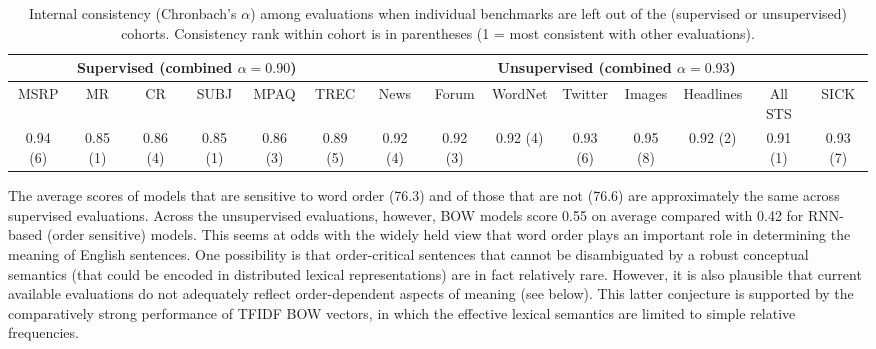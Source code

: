 \documentclass[11pt,letterpaper]{article}
\begin{document}
\hspace*{-2cm}
\begin{table*}[ht]
\begin{adjustwidth}{-1cm}{}
\renewcommand{\tabcolsep}{4.6pt}
\footnotesize
\begin{center}
      {
        \begin{tabular}{cccccc|cccccccc}
          \multicolumn{6}{c|}{Supervised (combined \(\alpha = 0.90\))} & \multicolumn{8}{c}{Unsupervised (combined \(\alpha = 0.93\))} \\
          \hline
                     MSRP & MR & CR & SUBJ & MPAQ & TREC & News & Forum & WordNet & Twitter & Images & Headlines & All STS  & SICK \\
                                          \footnotesize  0.94 (6) &	0.85 (1)	 &0.86 (4)	 &0.85 (1) &	0.86	(3) &0.89 (5) &	0.92	(4) &0.92 (3)	 &0.92 (4) &	0.93 (6)  &	0.95 (8)	 &0.92 (2)  &	0.91 (1)  &0.93 (7) \\
                                          \hline
        \end{tabular}
    }
    \caption{\label{consistency} Internal consistency (Chronbach's \(\alpha\)) among evaluations when individual benchmarks are left out of the (supervised or unsupervised) cohorts. Consistency rank within cohort is in parentheses (1 = most consistent with other evaluations).}
  \end{center}
  \vspace*{-4ex}
  \end{adjustwidth}
\end{table*}

  



\vspace{5pt} 
The average scores of models that are sensitive to word order (76.3) and of those that are not (76.6) are approximately the same across supervised evaluations. Across the unsupervised evaluations, however, BOW models score 0.55 on average compared with 0.42 for RNN-based (order sensitive) models. This seems at odds with the widely held view that word order plays an important role in determining the meaning of English sentences. One possibility is that order-critical sentences that cannot be disambiguated by a robust conceptual semantics (that could be encoded in distributed lexical representations) are in fact relatively rare. However, it is also plausible that current available evaluations do not adequately reflect order-dependent aspects of meaning (see below). This latter conjecture is supported by the comparatively strong performance of TFIDF BOW vectors, in which the effective lexical semantics are limited to simple relative frequencies.  
\end{document}
